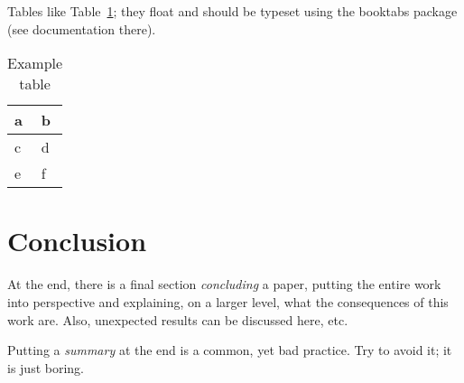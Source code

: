 Tables  like Table~\ref{tab:example}; they float and should be typeset using the booktabs package (see
documentation there). 


\begin{table}[htbp]
  \centering
  \begin{tabular}{ll}
    \toprule 
    a & b \\
    \midrule 
    c & d \\
    e & f \\
    \bottomrule
  \end{tabular}
  \caption{Example table}
  \label{tab:example}
\end{table}



\section{Conclusion}
\label{sec:concl}

At the end, there is a final section \emph{concluding} a paper,
putting the entire work into perspective and explaining, on a larger
level, what the consequences of this work are. Also, unexpected
results can be discussed here, etc.

Putting a \emph{summary} at the end is a common, yet bad practice. Try
to avoid it; it is just boring. 

 